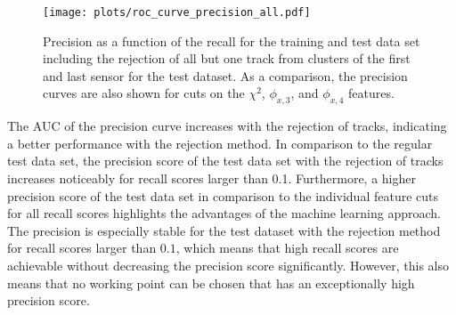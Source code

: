 
\begin{figure}[H]
  \centering
  \texttt{[image: plots/roc\_curve\_precision\_all.pdf]}
  \caption{Precision as a function of the recall for the training and test data set including the rejection of all but one track from clusters of the first and last
           sensor for the test dataset. As a comparison, the precision curves are also shown for cuts on the $\chi^2$, $\phi_{x,3}$, and $\phi_{x,4}$ features.}
  \label{fig:precision}
\end{figure}
The AUC of the precision curve increases with the rejection of tracks,
indicating a better performance with the rejection method. In comparison to the regular test data set, the precision score
of the test data set with the rejection of tracks increases noticeably for recall scores larger than 0.1.
Furthermore, a higher precision score of the test data set in comparison to the individual feature cuts for all recall scores highlights the advantages of the machine
learning approach. The precision is especially stable for the test dataset with the rejection method for recall scores larger than $0.1$, which means that high recall scores
are achievable without decreasing the precision score significantly. However, this also means that no working point can be chosen that has an exceptionally high precision score.
